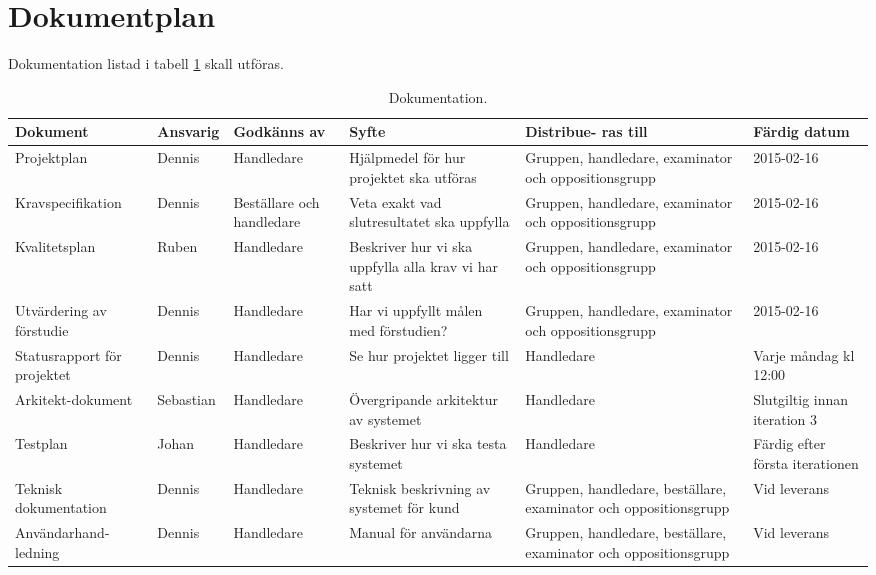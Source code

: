 \section{Dokumentplan}
Dokumentation listad i tabell \ref{dokumentation:tabell} skall utföras.

\begin{table}[H]
	\centering
		\begin{tabularx}{\textwidth}{| p{25mm} | l | X | p{25mm} | X | X |}
			\hline
			\textbf{Dokument} & \textbf{Ansvarig} & \textbf{Godkänns av} & \textbf{Syfte} & \textbf{Distribue-
  ras till} & \textbf{Färdig datum} \\\hline

    		
			{Projektplan} & {Dennis} & {Handledare} & {Hjälpmedel för hur projektet ska utföras} & {Gruppen, handledare, examinator och oppositionsgrupp} & {2015-02-16} \\\hline
			
			{Kravspecifikation} & {Dennis} & {Beställare och handledare} & {Veta exakt vad slutresultatet ska uppfylla} & {Gruppen, handledare, examinator och oppositionsgrupp} & {2015-02-16} \\\hline
			
			{Kvalitetsplan} & {Ruben} & {Handledare} & {Beskriver hur vi ska uppfylla alla krav vi har satt} & {Gruppen, handledare, examinator och oppositionsgrupp} & {2015-02-16} \\\hline
			
						{Utvärdering av förstudie} & {Dennis} & {Handledare} & {Har vi uppfyllt målen med förstudien?} & {Gruppen, handledare, examinator och oppositionsgrupp} & {2015-02-16} \\\hline
			
			{Statusrapport för projektet} & {Dennis} & {Handledare} & {Se hur projektet ligger till} & {Handledare} & {Varje måndag kl 12:00} \\\hline
			
            {Arkitekt-dokument} & {Sebastian} & {Handledare} & {Övergripande arkitektur av systemet} & {Handledare} & {Slutgiltig innan iteration 3} \\\hline
               {Testplan} & {Johan} & {Handledare} & {Beskriver hur vi ska testa systemet} & {Handledare} & {Färdig efter första iterationen} \\\hline

          {Teknisk dokumentation} & {Dennis} & {Handledare} & {Teknisk beskrivning av systemet för kund} & {Gruppen, handledare, beställare, examinator och oppositionsgrupp} & {Vid leverans} \\\hline			
			
            {Användarhand-ledning} & {Dennis} & {Handledare} & {Manual för användarna} & {Gruppen, handledare, beställare, examinator och oppositionsgrupp} & {Vid leverans} \\\hline
            
			
			
		\end{tabularx}
	\caption{Dokumentation.} \label{dokumentation:tabell}
\end{table}
